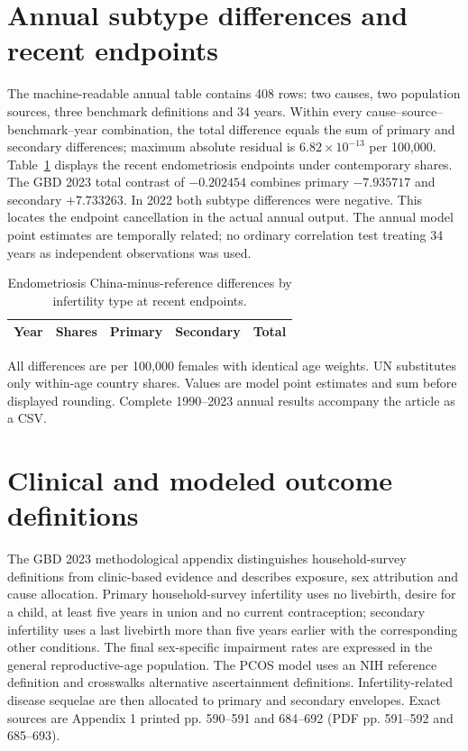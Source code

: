 \documentclass[11pt,a4paper]{article}
\begin{document}
\section*{Annual subtype differences and recent endpoints}
The machine-readable annual table contains 408 rows: two causes, two population sources, three benchmark definitions and 34 years. Within every cause--source--benchmark--year combination, the total difference equals the sum of primary and secondary differences; maximum absolute residual is $6.82\times10^{-13}$ per 100,000. Table~\ref{tab:s10} displays the recent endometriosis endpoints under contemporary shares. The GBD 2023 total contrast of $-0.202454$ combines primary $-7.935717$ and secondary $+7.733263$. In 2022 both subtype differences were negative. This locates the endpoint cancellation in the actual annual output. The annual model point estimates are temporally related; no ordinary correlation test treating 34 years as independent observations was used.

\small
\begin{longtable}{rlrrr}
\caption{Endometriosis China-minus-reference differences by infertility type at recent endpoints.}\label{tab:s10}\\
\toprule Year & Shares & Primary & Secondary & Total\\\midrule\endhead

\end{longtable}\normalsize
All differences are per 100,000 females with identical age weights. UN substitutes only within-age country shares. Values are model point estimates and sum before displayed rounding. Complete 1990--2023 annual results accompany the article as a CSV.

\section*{Clinical and modeled outcome definitions}
The GBD 2023 methodological appendix distinguishes household-survey definitions from clinic-based evidence and describes exposure, sex attribution and cause allocation. Primary household-survey infertility uses no livebirth, desire for a child, at least five years in union and no current contraception; secondary infertility uses a last livebirth more than five years earlier with the corresponding other conditions. The final sex-specific impairment rates are expressed in the general reproductive-age population. The PCOS model uses an NIH reference definition and crosswalks alternative ascertainment definitions. Infertility-related disease sequelae are then allocated to primary and secondary envelopes. Exact sources are Appendix 1 printed pp. 590--591 and 684--692 (PDF pp. 591--592 and 685--693).
\end{document}
